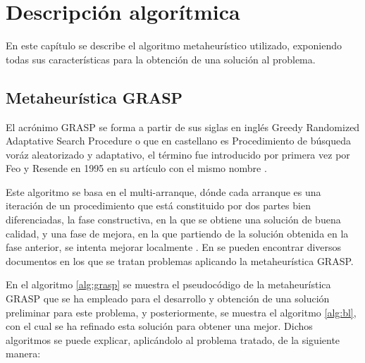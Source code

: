 
\chapter{Descripción algorítmica} %

\label{Chapter3}

En este capítulo se describe el algoritmo metaheurístico utilizado, exponiendo todas sus características para la obtención de una solución al problema.

\section{Metaheurística GRASP}
El acrónimo \gls{GRASP} se forma a partir de sus siglas en inglés Greedy Randomized Adaptative Search Procedure o que en castellano es Procedimiento de búsqueda voráz aleatorizado y adaptativo, el término fue introducido por primera vez por Feo y Resende en 1995 en su artículo con el mismo nombre \cite{grasp-feo-resende}.

Este algoritmo se basa en el multi-arranque, dónde cada arranque es una iteración de un procedimiento que está constituido por dos partes bien diferenciadas, la fase constructiva, en la que se obtiene una solución de buena calidad, y una fase de mejora, en la que partiendo de la solución obtenida en la fase anterior, se intenta mejorar localmente \cite{libro-metaheuristicas}. 
En \cite{grasp-flightrecoveryproblem} \cite{grasp-parallel} \cite{grasp-weapon} \cite{grasp-empaquetado} \cite{grasp-ruta} \cite{grasp-vertex} se pueden encontrar diversos documentos en los que se tratan problemas aplicando la metaheurística \gls{GRASP}.

En el algoritmo \ref{alg:grasp} se muestra el pseudocódigo de la metaheurística \gls{GRASP} que se ha empleado para el desarrollo y obtención de una solución preliminar para este problema, y posteriormente, se muestra el algoritmo \ref{alg:bl}, con el cual se ha refinado esta solución para obtener una mejor. Dichos algoritmos se puede explicar, aplicándolo al problema tratado, de la siguiente manera:\\

